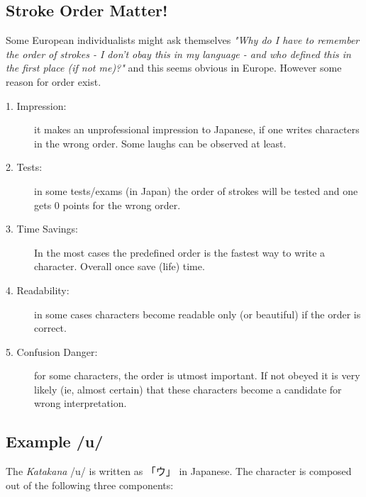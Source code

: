 \subsection{Stroke Order Matter!}
\label{sec:StrokeOrderMatter}

Some European individualists might ask themselves \textit{"Why do I have to
remember the order of strokes - I don't obay this in my language - and who
defined this in the first place (if not me)?"} and this seems obvious in
Europe. However some reason for order exist.


\begin{description}

\item[1. Impression:] it makes an unprofessional impression to Japanese, if one
writes characters in the wrong order. Some laughs can be observed at least.

\item[2. Tests:]  in some tests/exams (in Japan) the order of strokes will be
tested and one gets 0 points for the wrong order.

\item[3. Time Savings:] In the most cases the predefined order is the fastest
way to write a character. Overall once save (life) time.

\item[4. Readability:] in some cases characters become readable only (or
beautiful) if the order is correct.

\item[5. Confusion Danger:] for some characters, the order is utmost
important. If not obeyed it is very likely (ie, almost certain) that these
characters become a candidate for wrong interpretation.

\end{description}
\normalsize

\newpage
\subsection{Example /u/ }
\label{subsec:ExampleU}

The \textit{Katakana} /u/ is written as {「ウ」} in Japanese. The character is
composed out of the following three components:

